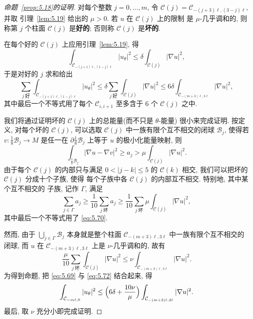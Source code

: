 
\begin{proof}[命题~\ref{prop:5.18}的证明]
对每个整数 $j=0,\dots,m$, 令
$\mathcal{C}(j)=\mathcal{C}_{-(j+3)\ell,(3-j)\ell}$, 并取
引理~\ref{lem:5.19} 给出的 $\mu>0$. 若 $u$ 在 $\mathcal{C}(j)$ 上的限制
是 $\mu$-几乎调和的, 则称第 $j$ 个柱面 $\mathcal{C}(j)$ 是\textbf{好的};
否则称 $\mathcal{C}(j)$ 是\textbf{坏的}.

在每个好的 $\mathcal{C}(j)$ 上应用引理~\ref{lem:5.19}, 得
\begin{equation}
\int_{\mathcal{C}_{-(j+1)\ell,(1-j)\ell}}|u_\theta|^2
\leq\delta\int_{\mathcal{C}(j)}|\nabla u|^2,
\label{eq:5.68}
\end{equation}
于是对好的 $j$ 求和给出
\begin{equation}
\sum_{j\ \text{好}}\int_{\mathcal{C}_{-(j+1)\ell,(1-j)\ell}}|u_\theta|^2
\leq\delta\sum_{j\ \text{好}}\int_{\mathcal{C}(j)}|\nabla u|^2
\leq 6\delta\int_{\mathcal{C}_{-(m+3)\ell,3\ell}}|\nabla u|^2,
\label{eq:5.69}
\end{equation}
其中最后一个不等式用了每个 $\mathcal{C}_{i,i+1}$ 至多含于 $6$ 个
$\mathcal{C}(j)$ 之中.

我们将通过证明坏的 $\mathcal{C}(j)$ 上的总能量(而不只是 $\theta$-能量)
很小来完成证明. 按定义, 对每个坏的 $\mathcal{C}(j)$, 可以选取
$\mathcal{C}(j)$ 中一族有限个互不相交的闭球 $\mathcal{B}_j$, 使得若
$v:\frac18\mathcal{B}_j\to M$ 是任一在
$\partial\frac18\mathcal{B}_j$ 上等于 $u$ 的极小化能量映射, 则
\begin{equation}
\int_{\frac18\mathcal{B}_j}|\nabla u-\nabla v|^2\geq a_j
>\mu\int_{\mathcal{C}(j)}|\nabla u|^2.
\label{eq:5.70}
\end{equation}
由于每个 $\mathcal{C}(j)$ 的内部只与满足 $0<|j-k|\leq 5$ 的
$\mathcal{C}(k)$ 相交, 我们可以把坏的 $\mathcal{C}(j)$ 分成十个子族, 使得
每个子族中各 $\mathcal{C}(j)$ 的内部互不相交. 特别地, 其中某个互不相交的
子族, 记作 $\Gamma$, 满足
\begin{equation}
\sum_{j\in\Gamma}a_j\geq\frac1{10}\sum_{j\ \text{坏}}a_j
\geq\frac1{10}\sum_{j\ \text{坏}}\mu\int_{\mathcal{C}(j)}|\nabla u|^2,
\label{eq:5.71}
\end{equation}
其中最后一个不等式用了 \eqref{eq:5.70}.

然而, 由于 $\bigcup_{j\in\Gamma}\mathcal{B}_j$ 本身就是整个柱面
$\mathcal{C}_{-(m+3)\ell,3\ell}$ 中一族有限个互不相交的闭球, 而 $u$ 在
$\mathcal{C}_{-(m+3)\ell,3\ell}$ 上是 $\nu$-几乎调和的, 故有
\begin{equation}
\frac{\mu}{10}\sum_{j\ \text{坏}}\int_{\mathcal{C}(j)}|\nabla u|^2
\leq\nu\int_{\mathcal{C}_{-(m+3)\ell,3\ell}}|\nabla u|^2.
\label{eq:5.72}
\end{equation}
为得到命题, 把 \eqref{eq:5.69} 与 \eqref{eq:5.72} 结合起来, 得
\begin{equation}
\int_{\mathcal{C}_{-m\ell,0}}|u_\theta|^2
\leq\Bigl(6\delta+\frac{10\nu}{\mu}\Bigr)
\int_{\mathcal{C}_{-(m+3)\ell,3\ell}}|\nabla u|^2.
\label{eq:5.73}
\end{equation}
最后, 取 $\nu$ 充分小即完成证明.
\end{proof}

